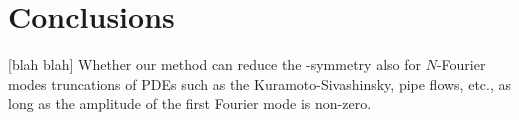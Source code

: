 \section{Conclusions}
\label{s:concl}

 [blah blah]
Whether our method can reduce
the -symmetry also for $N$-Fourier modes truncations of PDEs such as
the Kuramoto-Sivashinsky, pipe flows, etc., as long as the amplitude of
the first Fourier mode is non-zero.
